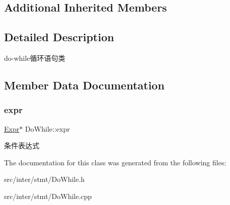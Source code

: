 \subsection*{Additional Inherited Members}


\subsection{Detailed Description}
do-\/while循环语句类 

\subsection{Member Data Documentation}
\mbox{\label{class_do_while_a55d5ffb9c6bee10f8375f028705e4901}} 
\subsubsection{\texorpdfstring{expr}{expr}}
{\footnotesize\ttfamily \hyperlink{class_expr}{Expr}$\ast$ Do\+While\+::expr}

条件表达式 

The documentation for this class was generated from the following files\+:\begin{DoxyCompactItemize}
\item 
src/inter/stmt/Do\+While.\+h\item 
src/inter/stmt/Do\+While.\+cpp\end{DoxyCompactItemize}
